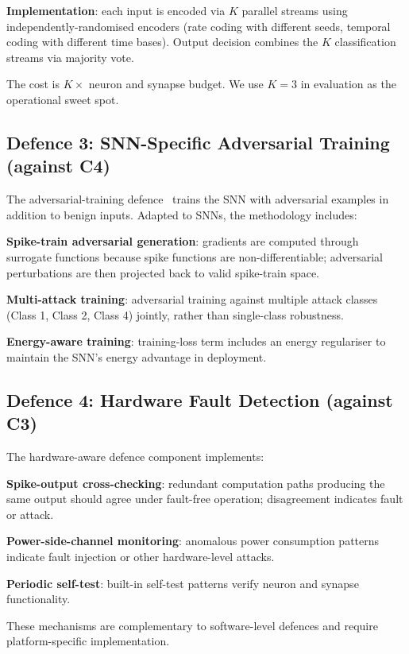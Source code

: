 \documentclass[sigconf,nonacm]{acmart}
\begin{document}
\textbf{Implementation}: each input is encoded via $K$ parallel
streams using independently-randomised
encoders (rate coding with different seeds, temporal coding with
different time bases). Output decision combines the $K$
classification streams via majority vote.

The cost is $K \times$ neuron and synapse budget. We use $K = 3$
in evaluation as the operational sweet spot.

\subsection{Defence 3: SNN-Specific Adversarial Training (against C4)}

The adversarial-training defence~\cite{madry2018towards,
panda2024snntraining} trains the SNN with adversarial examples in
addition to benign inputs. Adapted to SNNs, the methodology
includes:

\textbf{Spike-train adversarial generation}: gradients are computed
through surrogate functions because spike functions are
non-differentiable; adversarial perturbations are then projected
back to valid spike-train space.

\textbf{Multi-attack training}: adversarial training against
multiple attack classes (Class 1, Class 2, Class 4) jointly,
rather than single-class robustness.

\textbf{Energy-aware training}: training-loss term includes an
energy regulariser to maintain the SNN's energy advantage in
deployment.

\subsection{Defence 4: Hardware Fault Detection (against C3)}

The hardware-aware defence component implements:

\textbf{Spike-output cross-checking}: redundant computation paths
producing the same output should agree under fault-free
operation; disagreement indicates fault or attack.

\textbf{Power-side-channel monitoring}: anomalous power
consumption patterns indicate fault injection or other
hardware-level attacks.

\textbf{Periodic self-test}: built-in self-test patterns verify
neuron and synapse functionality.

These mechanisms are complementary to software-level defences and
require platform-specific implementation.
\end{document}
